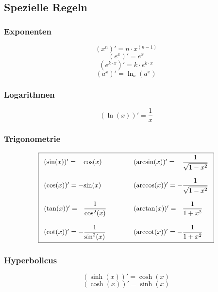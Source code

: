\newpage

\subsection{Spezielle Regeln}

\subsubsection{Exponenten}
\[ \boxed{ (x^n)' = n\cdot x^{(n-1)} } \]
\[ \boxed{ (e^x)' = e^x } \]
\[ \boxed{ (e^{k\cdot x})' = k \cdot e^{k\cdot x} } \]
\[ \boxed{ (a^x)' = \ln_a (a^x) } \]

\subsubsection{Logarithmen}
\[ \boxed{ (\ln(x))' = \frac{1}{x} } \]  

\subsubsection{Trigonometrie}

\[ \boxed{ \begin{array}{ l @{}l @{\quad\quad\quad}l @{}l }
(\sin(x))' =   &\cos(x)             & \quad (\arcsin(x))' =   & \dfrac{1}{\sqrt{1 - x^2}} \\\\
(\cos(x))' = - &\sin(x)             & \quad (\arccos(x))' = - & \dfrac{1}{\sqrt{1 - x^2}} \\\\
(\tan(x))' =   &\dfrac{1}{\cos^2(x)} & \quad (\arctan(x))' =   & \dfrac{1}{1 + x^2} \\\\
(\cot(x))' = - &\dfrac{1}{\sin^2(x)} & \quad (\arccot(x))' = - & \dfrac{1}{1 + x^2} 
\end{array}} \]

\subsubsection{Hyperbolicus}
\[ \boxed{(\sinh(x))' = \cosh(x)} \]
\[ \boxed{(\cosh(x))' = \sinh(x)} \]
